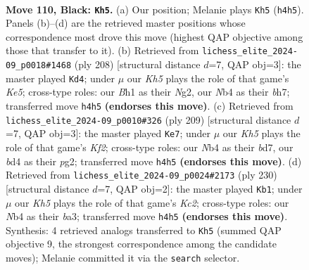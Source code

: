 \documentclass[11pt]{article}
\begin{document}
\clearpage

\begin{figure}[p]\centering
\begin{subfigure}{0.46\textwidth}\centering
\resizebox{\linewidth}{!}{%
\newchessgame
\chessboard[
  setfen={8/8/8/8/1n1B3k/8/4KP2/7b b - - 66 110},
  showmover=false,
  pgfstyle=straightmove, color=movearrow, markmove={h4-h5}
]}
\caption{}
\end{subfigure}\hfill
\begin{subfigure}{0.46\textwidth}\centering
\resizebox{\linewidth}{!}{%
\newchessgame
\chessboard[
  setfen={8/7b/8/4K3/6k1/6p1/6N1/8 w - - 36 105},
  showmover=false,
  pgfstyle=straightmove, color=movearrow, markmove={e5-d4}
]}
\caption{}
\end{subfigure}
\\[4pt]
\begin{subfigure}{0.46\textwidth}\centering
\resizebox{\linewidth}{!}{%
\newchessgame
\chessboard[
  setfen={8/3B1k2/8/2b1P3/4K3/8/6P1/8 b - - 10 105},
  showmover=false,
  pgfstyle=straightmove, color=movearrow, markmove={f7-e7}
]}
\caption{}
\end{subfigure}\hfill
\begin{subfigure}{0.46\textwidth}\centering
\resizebox{\linewidth}{!}{%
\newchessgame
\chessboard[
  setfen={8/8/8/8/8/b4pk1/2K5/5B2 w - - 0 116},
  showmover=false,
  pgfstyle=straightmove, color=movearrow, markmove={c2-b1}
]}
\caption{}
\end{subfigure}
\caption{\textbf{Move 110, Black: \texttt{Kh5}.} (a) Our position; Melanie plays \texttt{Kh5} (\texttt{h4h5}). Panels (b)--(d) are the retrieved master positions whose correspondence most drove this move (highest QAP objective among those that transfer to it). (b) Retrieved from \texttt{lichess\_elite\_2024-09\_p0018\#1468} (ply 208) [structural distance $d$=7, QAP obj=3]: the master played \texttt{Kd4}; under $\mu$ our \emph{Kh5} plays the role of that game's \emph{Ke5}; cross-type roles: our \emph{B}h1 as their \emph{N}g2, our \emph{N}b4 as their \emph{b}h7; transferred move \texttt{h4h5} \textbf{(endorses this move)}. (c) Retrieved from \texttt{lichess\_elite\_2024-09\_p0010\#326} (ply 209) [structural distance $d$=7, QAP obj=3]: the master played \texttt{Ke7}; under $\mu$ our \emph{Kh5} plays the role of that game's \emph{Kf2}; cross-type roles: our \emph{N}b4 as their \emph{b}d7, our \emph{b}d4 as their \emph{p}g2; transferred move \texttt{h4h5} \textbf{(endorses this move)}. (d) Retrieved from \texttt{lichess\_elite\_2024-09\_p0024\#2173} (ply 230) [structural distance $d$=7, QAP obj=2]: the master played \texttt{Kb1}; under $\mu$ our \emph{Kh5} plays the role of that game's \emph{Kc2}; cross-type roles: our \emph{N}b4 as their \emph{b}a3; transferred move \texttt{h4h5} \textbf{(endorses this move)}. Synthesis: 4 retrieved analogs transferred to \texttt{Kh5} (summed QAP objective 9, the strongest correspondence among the candidate moves); Melanie committed it via the \texttt{search} selector.}
\label{fig:thought-m219}
\end{figure}
\end{document}
